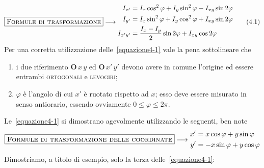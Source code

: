 \begin{equation} \label{equazione4-1}
\boxed{\textup{\textsc{Formule di trasformazione}}} \longrightarrow
\begin{aligned}
I_{x'} &= I_{x}\cos^{2}\varphi+I_{y}\sin^{2}\varphi-I_{xy}\sin 2\varphi \\ 
I_{y'} &= I_{x}\sin^{2}\varphi+I_{y}\cos^{2}\varphi+I_{xy}\sin 2\varphi \\
I_{x'y'} &= \frac{I_{x}-I_{y}}{2}\sin 2\varphi+I_{xy}\cos 2\varphi
\end{aligned}
\tag{4.1}
\end{equation}
Per una corretta utilizzazione delle~\eqref{equazione4-1} vale la pena sottolineare che
\begin{enumerate}
\item i due riferimento $\mathbf{O}\,x\,y$ ed $\mathbf{O}\,x'\,y'$ devono avere in comune l'origine ed essere entrambi \textsc{ortogonali} e \textsc{levogiri};
\item $\varphi$ è l'angolo di cui $x'$ è ruotato rispetto ad $x$; esso deve essere misurato in senso antiorario, essendo ovviamente $0\le\varphi\le 2\pi$.
\end{enumerate}
Le~\eqref{equazione4-1} si dimostrano agevolmente utilizzando le seguenti, ben note
\begin{equation*}
\boxed{\textup{\textsc{Formule di trasformazione delle coordinate}}} \longrightarrow
\begin{aligned}
x' &= x\cos\varphi+y\sin\varphi \notag \\ 
y' &= -x\sin\varphi+y\cos\varphi \notag
\end{aligned}
\end{equation*}
Dimostriamo, a titolo di esempio, solo la terza delle~\eqref{equazione4-1}:
